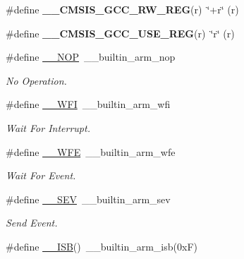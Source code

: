 \begin{DoxyCompactItemize}
\item 
\mbox{\label{group___c_m_s_i_s___core___instruction_interface_ga03179f79efee45c226dddfb8d824ad83}} 
\#define {\bfseries \+\_\+\+\_\+\+C\+M\+S\+I\+S\+\_\+\+G\+C\+C\+\_\+\+R\+W\+\_\+\+R\+EG}(r)~\char`\"{}+r\char`\"{} (r)
\item 
\mbox{\label{group___c_m_s_i_s___core___instruction_interface_ga9d94dee7402367961d2cf0accc00fd97}} 
\#define {\bfseries \+\_\+\+\_\+\+C\+M\+S\+I\+S\+\_\+\+G\+C\+C\+\_\+\+U\+S\+E\+\_\+\+R\+EG}(r)~\char`\"{}r\char`\"{} (r)
\item 
\#define \mbox{\hyperlink{group___c_m_s_i_s___core___instruction_interface_gabd585ddc865fb9b7f2493af1eee1a572}{\+\_\+\+\_\+\+N\+OP}}~\+\_\+\+\_\+builtin\+\_\+arm\+\_\+nop
\begin{DoxyCompactList}\small\item\em No Operation. \end{DoxyCompactList}\item 
\#define \mbox{\hyperlink{group___c_m_s_i_s___core___instruction_interface_gad23bf2b78a9a4524157c9de0d30b7448}{\+\_\+\+\_\+\+W\+FI}}~\+\_\+\+\_\+builtin\+\_\+arm\+\_\+wfi
\begin{DoxyCompactList}\small\item\em Wait For Interrupt. \end{DoxyCompactList}\item 
\#define \mbox{\hyperlink{group___c_m_s_i_s___core___instruction_interface_gaac6cc7dd4325d9cb40d3290fa5244b3d}{\+\_\+\+\_\+\+W\+FE}}~\+\_\+\+\_\+builtin\+\_\+arm\+\_\+wfe
\begin{DoxyCompactList}\small\item\em Wait For Event. \end{DoxyCompactList}\item 
\#define \mbox{\hyperlink{group___c_m_s_i_s___core___instruction_interface_gaab4f296d0022b4b10dc0976eb22052f9}{\+\_\+\+\_\+\+S\+EV}}~\+\_\+\+\_\+builtin\+\_\+arm\+\_\+sev
\begin{DoxyCompactList}\small\item\em Send Event. \end{DoxyCompactList}\item 
\#define \mbox{\hyperlink{group___c_m_s_i_s___core___instruction_interface_gaad233022e850a009fc6f7602be1182f6}{\+\_\+\+\_\+\+I\+SB}}()~\+\_\+\+\_\+builtin\+\_\+arm\+\_\+isb(0x\+F)

\end{DoxyCompactItemize}
